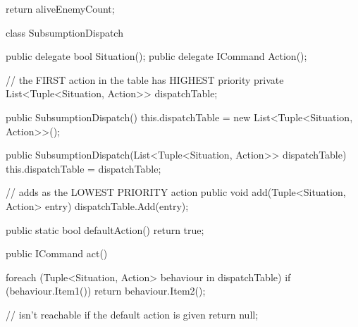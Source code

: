 \documentclass[11pt]{article}
\begin{document}
\begin{code}
{{{            return aliveEnemyCount;
        }

        class SubsumptionDispatch
        {
            public delegate bool Situation();
            public delegate ICommand Action();

            // the FIRST action in the table has HIGHEST priority
            private List<Tuple<Situation, Action>> dispatchTable;

            public SubsumptionDispatch()
            {
                this.dispatchTable = new List<Tuple<Situation, Action>>();
            }

            public SubsumptionDispatch(List<Tuple<Situation, Action>> dispatchTable)
            {
                this.dispatchTable = dispatchTable;
            }

            // adds as the LOWEST PRIORITY action
            public void add(Tuple<Situation, Action> entry)
            {
                dispatchTable.Add(entry);
            }

            public static bool defaultAction()
            {
                return true;
            }

            public ICommand act()
            {
                foreach (Tuple<Situation, Action> behaviour in dispatchTable)
                {
                    if (behaviour.Item1())
                    {
                        return behaviour.Item2();
                    }
                }

                // isn't reachable if the default action is given
                return null;
            }
        }
    }
}
\end{code}
\end{document}

